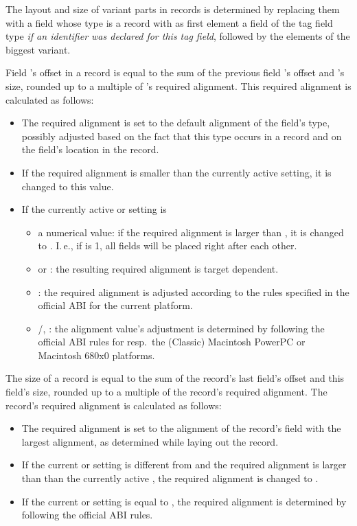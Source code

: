 The layout and size of variant parts in records is determined by
replacing them with a field whose type is a record with as first element
a field of the tag field type {\em if an identifier was declared for
this tag field}, followed by the elements of the biggest variant.

Field 's offset in a record is equal to the sum of the previous
field 's offset and 's size, rounded up to a multiple of
's required alignment. This required alignment is calculated as
follows:
\begin{itemize}
\item The required alignment is set to the default alignment of the
field's type, possibly adjusted based on the fact that this type occurs
in a record and on the field's location in the record.
\item If the required alignment is smaller than the currently active
 setting, it is changed to this 
value.
\item If the currently active  or
 setting is
  \begin{itemize}
  \item a numerical value: if the required alignment is larger than
  , it is changed to . I.\,e., if  is 1, all fields
  will be placed right after each other.
  \item {} or : the resulting required alignment
  is target dependent.
  \item {}: the required alignment is adjusted according to the
  rules specified in the official ABI for the current platform.
  \item {}/, : the alignment value's
  adjustment is determined by following the official ABI rules for
  resp.\ the (Classic) Macintosh PowerPC or Macintosh 680x0 platforms.
  \end{itemize}
\end{itemize}

The size of a record is equal to the sum of the record's last field's
offset and this field's size, rounded up to a multiple of the record's
required alignment. The record's required alignment is calculated as
follows:
\begin{itemize}
  \item The required alignment is set to the alignment of the record's
  field with the largest alignment, as determined while laying out the
  record.
  \item If the current  or  setting is different from  and the required alignment is
  larger than than the currently active , the required alignment is changed to .
  \item If the current  or  setting is equal to , the required alignment is determined
  by following the official ABI rules.
\end{itemize}

